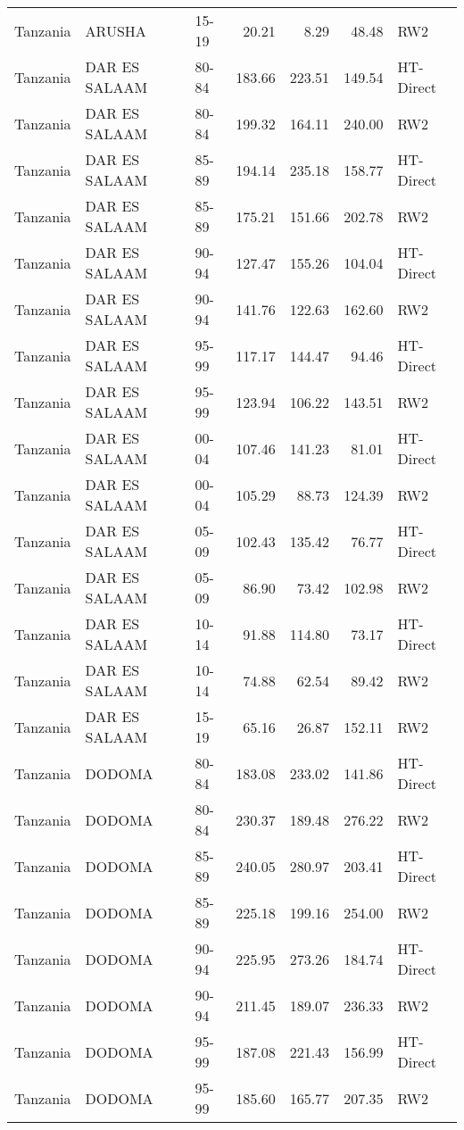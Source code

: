 \begin{longtable}{lllrrrl}
  Tanzania & ARUSHA & 15-19 & 20.21 & 8.29 & 48.48 & RW2 \\ 
  Tanzania & DAR ES SALAAM & 80-84 & 183.66 & 223.51 & 149.54 & HT-Direct \\ 
  Tanzania & DAR ES SALAAM & 80-84 & 199.32 & 164.11 & 240.00 & RW2 \\ 
  Tanzania & DAR ES SALAAM & 85-89 & 194.14 & 235.18 & 158.77 & HT-Direct \\ 
  Tanzania & DAR ES SALAAM & 85-89 & 175.21 & 151.66 & 202.78 & RW2 \\ 
  Tanzania & DAR ES SALAAM & 90-94 & 127.47 & 155.26 & 104.04 & HT-Direct \\ 
  Tanzania & DAR ES SALAAM & 90-94 & 141.76 & 122.63 & 162.60 & RW2 \\ 
  Tanzania & DAR ES SALAAM & 95-99 & 117.17 & 144.47 & 94.46 & HT-Direct \\ 
  Tanzania & DAR ES SALAAM & 95-99 & 123.94 & 106.22 & 143.51 & RW2 \\ 
  Tanzania & DAR ES SALAAM & 00-04 & 107.46 & 141.23 & 81.01 & HT-Direct \\ 
  Tanzania & DAR ES SALAAM & 00-04 & 105.29 & 88.73 & 124.39 & RW2 \\ 
  Tanzania & DAR ES SALAAM & 05-09 & 102.43 & 135.42 & 76.77 & HT-Direct \\ 
  Tanzania & DAR ES SALAAM & 05-09 & 86.90 & 73.42 & 102.98 & RW2 \\ 
  Tanzania & DAR ES SALAAM & 10-14 & 91.88 & 114.80 & 73.17 & HT-Direct \\ 
  Tanzania & DAR ES SALAAM & 10-14 & 74.88 & 62.54 & 89.42 & RW2 \\ 
  Tanzania & DAR ES SALAAM & 15-19 & 65.16 & 26.87 & 152.11 & RW2 \\ 
  Tanzania & DODOMA & 80-84 & 183.08 & 233.02 & 141.86 & HT-Direct \\ 
  Tanzania & DODOMA & 80-84 & 230.37 & 189.48 & 276.22 & RW2 \\ 
  Tanzania & DODOMA & 85-89 & 240.05 & 280.97 & 203.41 & HT-Direct \\ 
  Tanzania & DODOMA & 85-89 & 225.18 & 199.16 & 254.00 & RW2 \\ 
  Tanzania & DODOMA & 90-94 & 225.95 & 273.26 & 184.74 & HT-Direct \\ 
  Tanzania & DODOMA & 90-94 & 211.45 & 189.07 & 236.33 & RW2 \\ 
  Tanzania & DODOMA & 95-99 & 187.08 & 221.43 & 156.99 & HT-Direct \\ 
  Tanzania & DODOMA & 95-99 & 185.60 & 165.77 & 207.35 & RW2 \\ 

\end{longtable}
